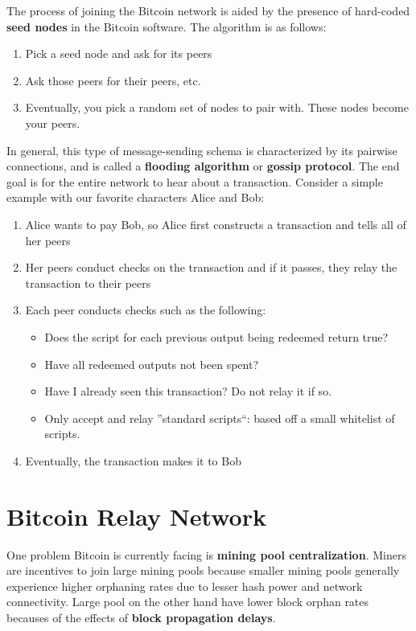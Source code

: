 \documentclass[full.tex]{subfiles}
\begin{document}
 The process of joining the Bitcoin network is aided by the presence of hard-coded \textbf{seed nodes} in the Bitcoin software. The algorithm is as follows:
 \begin{enumerate}
     \item Pick a seed node and ask for its peers
     \item Ask those peers for their peers, etc.
     \item Eventually, you pick a random set of nodes to pair with. These nodes become your peers.
 \end{enumerate}
 
 In general, this type of message-sending schema is characterized by its pairwise connections, and is called a \textbf{flooding algorithm} or \textbf{gossip protocol}. The end goal is for the entire network to hear about a transaction. Consider a simple example with our favorite characters Alice and Bob:
 
 \begin{enumerate}
     \item Alice wants to pay Bob, so Alice first constructs a transaction and tells all of her peers
     \item Her peers conduct checks on the transaction and if it passes, they relay the transaction to their peers
     \item Each peer conducts checks such as the following: \begin{itemize}
         \item Does the script for each previous output being redeemed return true?
         \item Have all redeemed outputs not been spent?
         \item Have I already seen this transaction? Do not relay it if so.
         \item Only accept and relay ''standard scripts``: based off a small whitelist of scripts.
     \end{itemize}
     \item Eventually, the transaction makes it to Bob
 \end{enumerate}
 
 \section*{Bitcoin Relay Network}
 
 One problem Bitcoin is currently facing is \textbf{mining pool centralization}. Miners are incentives to join large mining pools because smaller mining pools generally experience higher orphaning rates due to lesser hash power and network connectivity. Large pool on the other hand have lower block orphan rates becauses of the effects of \textbf{block propagation delays}.
 
\end{document}
